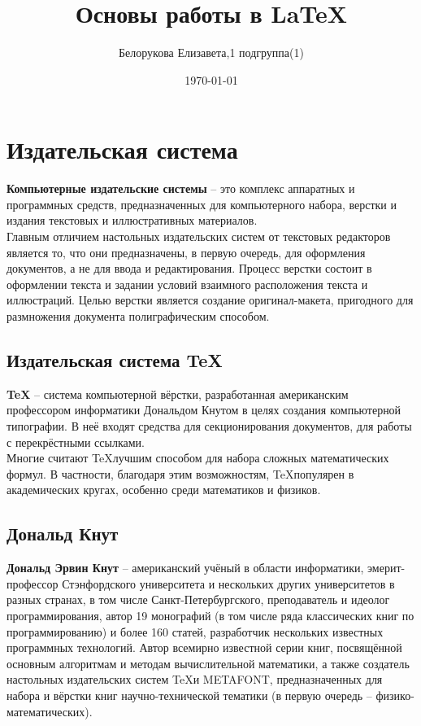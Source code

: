 \documentclass[a4paper,12pt]{article}
\title{Основы работы в \LaTeX}
\author{Белорукова Елизавета,1 подгруппа(1)}
\date{\today}
\begin{document}
\maketitle
\newpage
\section{Издательская система}

\textbf{Компьютерные издательские системы} -- это комплекс аппаратных и программных средств, предназначенных для компьютерного набора, верстки и издания текстовых и иллюстративных материалов. \\
Главным отличием настольных издательских систем от текстовых редакторов является то, что они предназначены, в первую очередь, для оформления документов, а не для ввода и редактирования. Процесс верстки состоит в оформлении текста и задании условий взаимного расположения текста и иллюстраций. Целью верстки является создание оригинал-макета, пригодного для размножения документа полиграфическим способом.

\subsection{Издательская система \TeX} 

\textbf{\TeX} -- система компьютерной вёрстки, разработанная американским профессором информатики Дональдом Кнутом в целях создания компьютерной типографии. В неё входят средства для секционирования документов, для работы с перекрёстными ссылками. \\
Многие считают \TeX лучшим способом для набора сложных математических формул. В частности, благодаря этим возможностям, \TeX популярен в академических кругах, особенно среди математиков и физиков.

\subsection{Дональд Кнут} 

\textbf{Дональд Эрвин Кнут} -- американский учёный в области информатики, эмерит-профессор Стэнфордского университета и нескольких других университетов в разных странах, в том числе Санкт-Петербургского, преподаватель и идеолог программирования, автор 19 монографий (в том числе ряда классических книг по программированию) и более 160 статей, разработчик нескольких известных программных технологий. Автор всемирно известной серии книг, посвящённой основным алгоритмам и методам вычислительной математики, а также создатель настольных издательских систем \TeX и METAFONT, предназначенных для набора и вёрстки книг научно-технической тематики (в первую очередь -- физико-математических).
\end{document}
